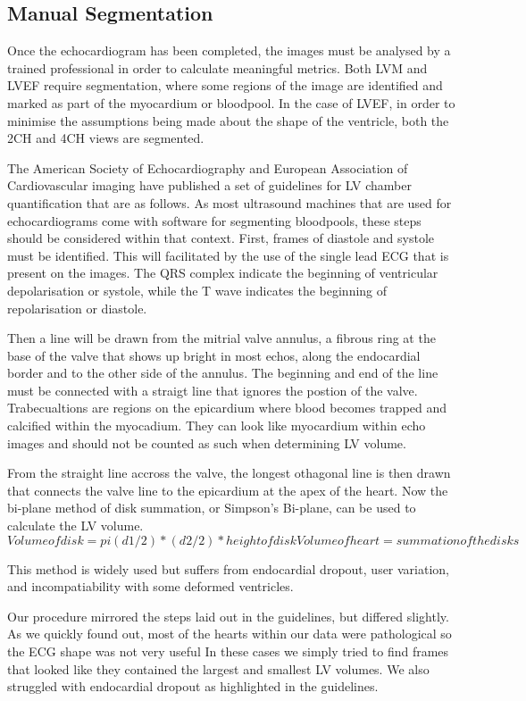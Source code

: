 \documentclass[12pt]{article}
\begin{document}
\subsection{Manual Segmentation}
Once the echocardiogram has been completed, the images must be analysed by a trained professional in order to calculate meaningful metrics.
Both LVM and LVEF require segmentation, where some regions of the image are identified and marked as part of the myocardium or bloodpool.
In the case of LVEF, in order to minimise the assumptions being made about the shape of the ventricle, both the 2CH and 4CH views are segmented.
\par
The American Society of Echocardiography and European Association of Cardiovascular imaging have published a set of guidelines for LV chamber quantification that are as follows.
As most ultrasound machines that are used for echocardiograms come with software for segmenting bloodpools, these steps should be considered within that context.
First, frames of diastole and systole must be identified.
This will facilitated by the use of the single lead ECG that is present on the images.
The QRS complex indicate the beginning of ventricular depolarisation or systole, while the T wave indicates the beginning of repolarisation or diastole.
\par
Then a line will be drawn from the mitrial valve annulus, a fibrous ring at the base of the valve that shows up bright in most echos, along the endocardial border and to the other side of the annulus.
The beginning and end of the line must be connected with a straigt line that ignores the postion of the valve. 
Trabecualtions are regions on the epicardium where blood becomes trapped and calcified within the myocadium.\cite{jacc_ef_p_and_c}
They can look like myocardium within echo images and should not be counted as such when determining LV volume. 
\par
From the straight line accross the valve, the longest othagonal line is then drawn that connects the valve line to the epicardium at the apex of the heart.
Now the bi-plane method of disk summation, or Simpson's Bi-plane, can be used to calculate the LV volume.
\begin{equation}
	Volume of disk = pi(d1/2)*(d2/2)*height of disk
	Volume of heart = summation of the disks
\end{equation}

This method is widely used but suffers from endocardial dropout, user variation, and incompatiability with some deformed ventricles.\cite{ase_quant_update}
\par
Our procedure  mirrored the steps laid out in the guidelines, but differed slightly.
As we quickly found out, most of the hearts within our data were pathological so the ECG shape was not very useful
In these cases we simply tried to find frames that looked like they contained the largest and smallest LV volumes.
We also struggled with endocardial dropout as highlighted in the guidelines.
\end{document}
